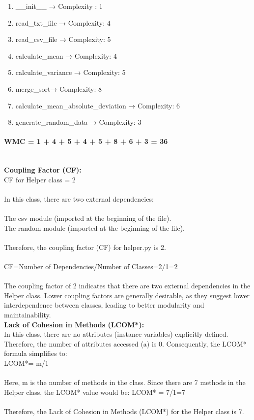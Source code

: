\documentclass[runningheads]{llncs}
\begin{document}
\begin{enumerate}
    \item \_\_init\_\_ → Complexity : 1
    \item read\_txt\_file → Complexity: 4
    \item read\_csv\_file → Complexity: 5
    \item calculate\_mean → Complexity: 4
    \item calculate\_variance → Complexity: 5
    \item merge\_sort→ Complexity: 8
    \item calculate\_mean\_absolute\_deviation → Complexity: 6
    \item generate\_random\_data → Complexity: 3
\end{enumerate}

\paragraph{WMC = 1 + 4 + 5 + 4 + 5 + 8 + 6 + 3 = 36\\ \\}
\textbf{Coupling Factor (CF):}\\
CF for Helper class = 2
\\ \\
In this class, there are two external dependencies:\\ \\
The csv module (imported at the beginning of the file).\\
The random module (imported at the beginning of the file).\\ \\
Therefore, the coupling factor (CF) for helper.py is 2.\\ \\
CF=Number of Dependencies/Number of Classes=2/1=2 \\ \\
The coupling factor of 2 indicates that there are two external dependencies in the Helper class. Lower coupling factors are generally desirable, as they suggest lower interdependence between classes, leading to better modularity and maintainability.\\

\textbf{Lack of Cohesion in Methods (LCOM*):}\\
In this class, there are no attributes (instance variables) explicitly defined. Therefore, the number of attributes accessed (a) is 0. Consequently, the LCOM* formula simplifies to:
\\
LCOM*= m/1
\\ \\
Here, m is the number of methods in the class.
Since there are 7 methods in the Helper class, the LCOM* value would be:
LCOM* = 7/1=7
\\ \\
Therefore, the Lack of Cohesion in Methods (LCOM*) for the Helper class is 7.
\end{document}
